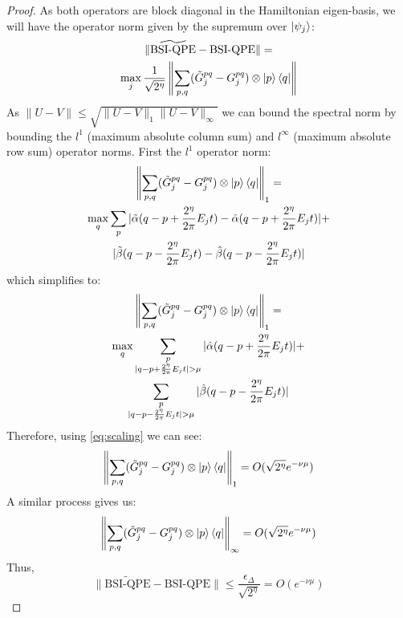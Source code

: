 \documentclass[aps,floatfix,10pt,amssymb,amsfont,amsmath,superscriptaddress,float,nofootinbib,longbibliography,nobalancelastpage,twocolumn]{revtex4-2}
\begin{document}
\begin{proof}
    As both operators are block diagonal in the Hamiltonian eigen-basis, we will have the operator norm given by the supremum over $\ket{\psi_j}$:
    \begin{multline}
        \|\widetilde{\text{BSI-QPE}}-\text{BSI-QPE}\| =\\ \max_j\frac{1}{\sqrt{2^{\eta}}} 
        \left\|\sum_{p,q}(\tilde G^{pq}_j - G^{pq}_j) \otimes \ket{p}\bra{q}\right\|
    \end{multline}
    As $\|U-V\| \leq \sqrt{\|U-V\|_{1}\|U-V\|_{\infty}}$ we can bound the spectral norm by bounding the $l^1$ (maximum absolute column sum) and $l^{\infty}$ (maximum absolute row sum) operator norms. First the $l^1$ operator norm:
    \begin{multline}
         \left\|\sum_{p,q}(\tilde G^{pq}_j - G^{pq}_j) \otimes \ket{p}\bra{q}\right\|_1 =\\ \max_q\sum_{p}|\tilde\alpha(q-p+\frac{2^{\eta}}{2\pi}E_jt)-\hat\alpha(q-p+\frac{2^{\eta}}{2\pi}E_jt)|+\\|\tilde\beta (q-p-\frac{2^{\eta}}{2\pi}E_jt)-\hat\beta (q-p-\frac{2^{\eta}}{2\pi}E_jt)|
    \end{multline}
    which simplifies to:
    \begin{multline}
         \left\|\sum_{p,q}(\tilde G^{pq}_j - G^{pq}_j) \otimes \ket{p}\bra{q}\right\|_1 =\\ \max_q\sum_{\substack{p\\|q-p+\frac{2^{\eta}}{2\pi}E_jt|>\mu}}|\hat\alpha(q-p+\frac{2^{\eta}}{2\pi}E_jt)|+\\\sum_{\substack{p\\|q-p-\frac{2^{\eta}}{2\pi}E_jt|>\mu}}|\hat\beta (q-p-\frac{2^{\eta}}{2\pi}E_jt)|
    \end{multline}
    Therefore, using \eqref{eq:scaling} we can see:
    \begin{equation}
        \left\|\sum_{p,q}(\tilde G^{pq}_j - G^{pq}_j) \otimes \ket{p}\bra{q}\right\|_1 = O(\sqrt{2^{\eta}}e^{-\nu \mu})
    \end{equation}
    A similar process gives us:
    \begin{equation}
        \left\|\sum_{p,q}(\tilde G^{pq}_j - G^{pq}_j) \otimes \ket{p}\bra{q}\right\|_{\infty} =O(\sqrt{2^{\eta}}e^{-\nu \mu})
    \end{equation}
    Thus,
    \begin{equation}
        \|\widetilde{\text{BSI-QPE}}-\text{BSI-QPE}\| \leq \frac{\epsilon_{\Delta}}{\sqrt{2^{\eta}}} = O\left(e^{-\nu \mu}\right)
    \end{equation}
\end{proof}
\end{document}
